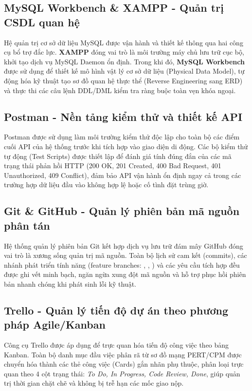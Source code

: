 \subsection{MySQL Workbench \& XAMPP - Quản trị CSDL quan hệ}
Hệ quản trị cơ sở dữ liệu MySQL được vận hành và thiết kế thông qua hai công cụ bổ trợ đắc lực. \textbf{XAMPP} đóng vai trò là môi trường máy chủ lưu trữ cục bộ, khởi tạo dịch vụ MySQL Daemon ổn định. Trong khi đó, \textbf{MySQL Workbench} được sử dụng để thiết kế mô hình vật lý cơ sở dữ liệu (Physical Data Model), tự động hóa kỹ thuật tạo sơ đồ quan hệ thực thể (Reverse Engineering sang ERD) và thực thi các câu lệnh DDL/DML kiểm tra ràng buộc toàn vẹn khóa ngoại.

\subsection{Postman - Nền tảng kiểm thử và thiết kế API}
Postman được sử dụng làm môi trường kiểm thử độc lập cho toàn bộ các điểm cuối API của hệ thống trước khi tích hợp vào giao diện di động. Các bộ kiểm thử tự động (Test Scripts) được thiết lập để đánh giá tính đúng đắn của các mã trạng thái phản hồi HTTP (200 OK, 201 Created, 400 Bad Request, 401 Unauthorized, 409 Conflict), đảm bảo API vận hành ổn định ngay cả trong các trường hợp dữ liệu đầu vào không hợp lệ hoặc cố tình đặt trùng giờ.

\subsection{Git \& GitHub - Quản lý phiên bản mã nguồn phân tán}
Hệ thống quản lý phiên bản Git kết hợp dịch vụ lưu trữ đám mây GitHub đóng vai trò là xương sống quản trị mã nguồn. Toàn bộ lịch sử cam kết (commits), các nhánh phát triển tính năng (feature branches: , , ) và các yêu cầu tích hợp đều được ghi vết minh bạch, ngăn ngừa xung đột mã nguồn và hỗ trợ phục hồi phiên bản nhanh chóng khi phát sinh lỗi kỹ thuật.

\subsection{Trello - Quản lý tiến độ dự án theo phương pháp Agile/Kanban}
Công cụ Trello được áp dụng để trực quan hóa tiến độ công việc theo bảng Kanban. Toàn bộ danh mục đầu việc phân rã từ sơ đồ mạng PERT/CPM được chuyển hóa thành các thẻ công việc (Cards) gắn nhãn phụ thuộc, phân loại trực quan theo 4 cột trạng thái: \textit{To Do, In Progress, Code Review, Done}, giúp quản trị thời gian chặt chẽ và không bị trễ hạn các mốc giao nộp.

